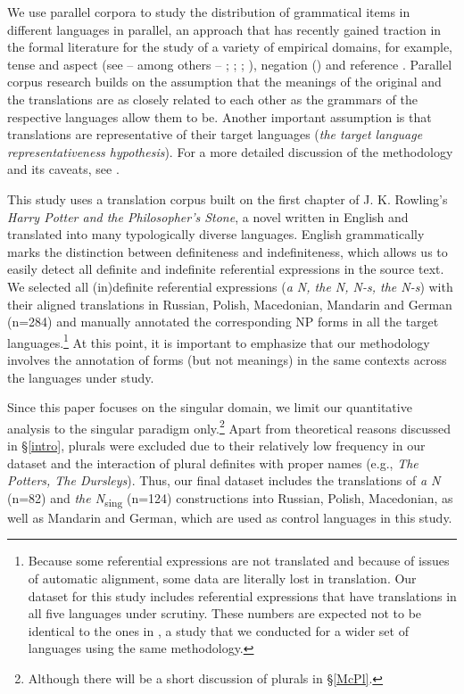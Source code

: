 \documentclass[output=paper,colorlinks,citecolor=brown]{langscibook}
\begin{document}
We use parallel corpora to study the distribution of grammatical items in different languages in parallel, an approach that has recently gained traction in the formal literature for the study
of a variety of empirical domains, for example, tense and aspect (see -- among others --  
 \citealt{Fuchs.Gonzales2022}; \citealt{Gehrke2022}; \citealt{Mo2022}; \citealt{Mulder.et.al2022}), negation (\citealt{deSwart2020}) and
reference \citep{Bremmers.et.al2021}. Parallel corpus research builds on the assumption that the meanings of the original and the translations are as closely related to each other as the grammars of the respective languages allow them to be. Another important assumption is
that translations are representative of their target languages (\textit{the target language
representativeness hypothesis}). For a more detailed discussion of the methodology and its
caveats, see \citet{LeBruyn.et.al2022a,LeBruyn.deSwart2022}.

This study uses a translation corpus built on the first chapter of J. K. Rowling's \textit{Harry Potter and the Philosopher's Stone}, a novel written in English and translated into many typologically diverse languages. English grammatically marks the distinction between definiteness and indefiniteness, which allows us to easily detect all definite and indefinite referential expressions in the source text. We selected all (in)definite referential expressions (\textit{a N, the N, N-s, the N-s}) with their aligned translations in Russian, Polish, Macedonian, Mandarin and German (n=284) and manually annotated the corresponding NP forms in all the target languages.\footnote{Because some referential expressions are not translated and because of issues of automatic alignment, some data are literally lost in translation. Our dataset for this study includes referential expressions that have translations in all five languages under scrutiny. These numbers are expected not to be identical to the ones in \citet{Liuetal2022}, a study that we conducted for a wider set of languages using the same methodology.} At this point, it is important to emphasize that our methodology involves the annotation of forms (but not meanings) in the same contexts across the languages under study. 


Since this paper focuses on the singular domain, we limit our quantitative analysis to the singular paradigm only.\footnote{Although there will be a short discussion of plurals in \S \ref{McPl}.} Apart from theoretical reasons discussed in \S \ref{intro}, plurals were excluded due to their relatively low frequency in our dataset and the interaction of plural definites with proper names (e.g., \textit{The Potters, The Dursleys}). Thus, our final dataset includes the translations of \textit{a N} (n=82) and \textit{the N}\textsubscript{sing} (n=124) constructions into Russian, Polish, Macedonian, as well as Mandarin and German, which are used as control languages in this study. 
\end{document}

